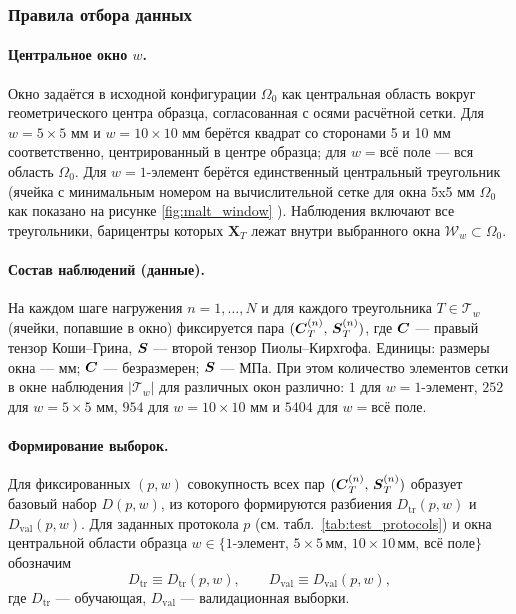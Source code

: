 \subsubsection{Правила отбора данных}
\paragraph{Центральное окно $w$.}
Окно задаётся в исходной конфигурации $\Omega_0$ как центральная область вокруг геометрического центра 
образца, согласованная с осями расчётной сетки.
Для $w=5\times5$ мм и $w=10\times10$ мм берётся квадрат со сторонами 5 и 10 мм соответственно, 
центрированный в центре образца; для $w=\text{всё поле}$ — вся область $\Omega_0$.
Для $w=\text{1-элемент}$ берётся единственный центральный треугольник 
(ячейка с минимальным номером на вычислительной сетке для окна 5x5 мм $\Omega_0$ как показано на рисунке \ref{fig:malt_window} ).
Наблюдения включают все треугольники, барицентры которых $\mathbf{X}_T$ лежат внутри выбранного окна $\mathcal{W}_w\subset\Omega_0$.

\paragraph{Состав наблюдений (данные).}
На каждом шаге нагружения $n=1,\dots,N$ и для каждого треугольника $T\in\mathcal{T}_w$ (ячейки, попавшие в окно) фиксируется пара $(\boldsymbol{C}_T^{(n)},\,\boldsymbol{S}_T^{(n)})$, 
где $\boldsymbol{C}$ — правый тензор Коши–Грина, $\boldsymbol{S}$ — второй тензор Пиолы–Кирхгофа.
Единицы: размеры окна — мм; $\boldsymbol{C}$ — безразмерен; $\boldsymbol{S}$ — МПа. 
При этом количество элементов сетки в окне наблюдения $|\mathcal{T}_w|$ для различных окон различно: 
$1$ для $w=\text{1-элемент}$, $252$ для $w=5\times5$ мм, $954$ для $w=10\times10$ мм и $5404$ для $w=\text{всё поле}$.

\paragraph{Формирование выборок.}
Для фиксированных $(p,w)$ совокупность всех пар $(\boldsymbol{C}_T^{(n)},\,\boldsymbol{S}_T^{(n)})$ образует базовый набор $D(p,w)$, из которого формируются разбиения $D_{\mathrm{tr}}(p,w)$ и $D_{\mathrm{val}}(p,w)$.
Для заданных протокола $p$ (см. табл.~\ref{tab:test_protocols}) 
и окна центральной области образца 
$w\in\{\text{1-элемент},\,5\times5\,\text{мм},\,10\times10\,\text{мм},\,\text{всё поле}\}$ обозначим
\[
  D_{\mathrm{tr}}\equiv D_{\mathrm{tr}}(p,w),\qquad D_{\mathrm{val}}\equiv D_{\mathrm{val}}(p,w),
\]
где $D_{\mathrm{tr}}$ — обучающая, $D_{\mathrm{val}}$ — валидационная выборки.



